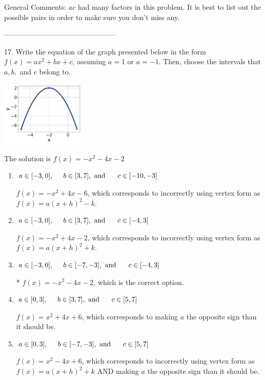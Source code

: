 \documentclass{article}[14pt]
\begin{document}
General Comments: $ac$ had many factors in this problem. It is best to list out the possible pairs in order to make sure you don't miss any.

-----------------------------------------------

17. Write the equation of the graph presented below in the form $f(x)=ax^2+bx+c$, assuming  $a=1$ or $a=-1$. Then, choose the intervals that $a, b,$ and $c$ belong to.
\begin{center} \includegraphics[width=0.3\textwidth]{../Figures/quadraticGraphToEquationB.png} \end{center} 

The solution is $ f(x) = -x^{2} -4 x -2 $ 

\begin{enumerate}[label=\Alph*.] 
\item $ a \in [-3, 0], \hspace*{5mm} b \in [3, 7], \text{ and } \hspace*{5mm} c \in [-10, -3] $ 

 $f(x)=-x^{2} +4 x -6$, which corresponds to incorrectly using vertex form as $f(x) = a(x+h)^2 - k$. 
\item $ a \in [-3, 0], \hspace*{5mm} b \in [3, 7], \text{ and } \hspace*{5mm} c \in [-4, 3] $ 

 $f(x)=-x^{2} +4 x -2$, which corresponds to incorrectly using vertex form as $f(x) = a(x+h)^2+k$. 
\item $ a \in [-3, 0], \hspace*{5mm} b \in [-7, -3], \text{ and } \hspace*{5mm} c \in [-4, 3] $ 

 * $f(x)=-x^{2} -4 x -2$, which is the correct option. 
\item $ a \in [0, 3], \hspace*{5mm} b \in [3, 7], \text{ and } \hspace*{5mm} c \in [5, 7] $ 

 $f(x)=x^{2} +4 x + 6$, which corresponds to making $a$ the opposite sign than it should be. 
\item $ a \in [0, 3], \hspace*{5mm} b \in [-7, -3], \text{ and } \hspace*{5mm} c \in [5, 7] $ 

 $f(x)=x^{2} -4 x + 6$, which corresponds to incorrectly using vertex form as $f(x) = a(x+h)^2+k$ AND making $a$ the opposite sign than it should be. 
\end{enumerate} 
 
\end{document}
